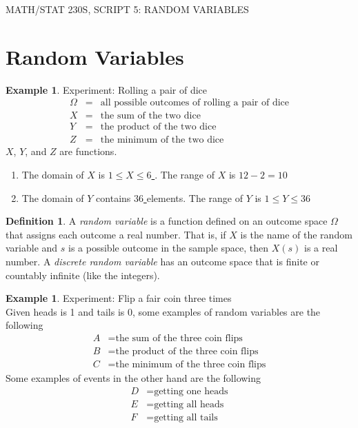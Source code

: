 \documentclass[12pt]{article}
\renewcommand{\_}[1]{\underline{ #1 }}
\theoremstyle{definition}
\newtheorem{definition}[theorem]{Definition}
\newtheorem{example}[theorem]{Example}
\numberwithin{equation}{subsection}
\begin{document}
\begin{center}
{\large MATH/STAT 230S, SCRIPT 5: RANDOM VARIABLES} \\ 
\vspace{.2in}  

\end{center} 


\setcounter{section}{4}


     
\section{Random Variables}


\begin{example}
	Experiment: Rolling a pair of dice 
	\begin{eqnarray*}
		\Omega &=&\text{all possible outcomes of rolling a pair of dice}\\
		X&=&\text{the sum of the two dice}\\
		Y&=&\text{the product of the two dice}\\
		Z&=&\text{the minimum of the two dice}
	\end{eqnarray*}
	$X$, $Y$, and $Z$ are functions.\\
	\begin{enumerate}
		\item The domain of $X$ is \_{$1 \leq X \leq 6$}. The range of $X$ is \_{$12 - 2 = 10$}
		\item The domain of $Y$ contains \_{$36$} elements. The range of $Y$ is \_{$1 \leq Y \leq 36$}
	\end{enumerate}
\end{example}

\begin{definition}
	A \emph{random variable} is a function defined on an outcome space $\Omega$ that assigns each outcome a real number. That is, if $X$ is the name of the random variable and $s$ is a possible outcome in the sample space, then $X(s)$ is a real number. A \emph{discrete random variable} has an outcome space that is finite or countably infinite (like the integers).
\end{definition}

\begin{example}
	Experiment: Flip a fair coin three times \\
	Given heads is 1 and tails is 0, some examples of random variables are the following
	\begin{align*}
		A&=\text{the sum of the three coin flips} \\
		B&=\text{the product of the three coin flips} \\
		C&=\text{the minimum of the three coin flips}
	\end{align*}
	Some examples of events in the other hand are the following
	\begin{align*}
		D&=\text{getting one heads} \\
		E&=\text{getting all heads} \\
		F&=\text{getting all tails}
	\end{align*}
\end{example}
\end{document}
